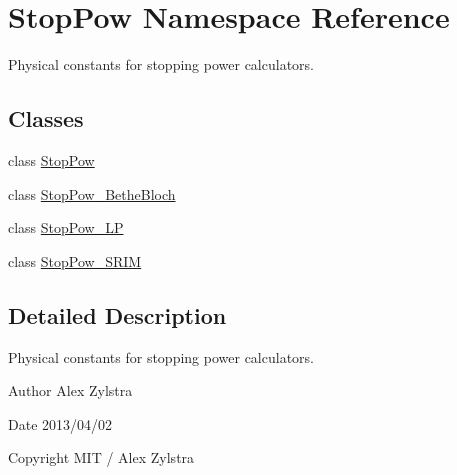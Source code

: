 \hypertarget{namespace_stop_pow}{\section{Stop\-Pow Namespace Reference}
\label{namespace_stop_pow}
}


Physical constants for stopping power calculators.  


\subsection*{Classes}
\begin{DoxyCompactItemize}
\item 
class \hyperlink{class_stop_pow_1_1_stop_pow}{Stop\-Pow}
\item 
class \hyperlink{class_stop_pow_1_1_stop_pow___bethe_bloch}{Stop\-Pow\-\_\-\-Bethe\-Bloch}
\item 
class \hyperlink{class_stop_pow_1_1_stop_pow___l_p}{Stop\-Pow\-\_\-\-L\-P}
\item 
class \hyperlink{class_stop_pow_1_1_stop_pow___s_r_i_m}{Stop\-Pow\-\_\-\-S\-R\-I\-M}
\end{DoxyCompactItemize}


\subsection{Detailed Description}
Physical constants for stopping power calculators. \begin{DoxyAuthor}{Author}
Alex Zylstra 
\end{DoxyAuthor}
\begin{DoxyDate}{Date}
2013/04/02 
\end{DoxyDate}
\begin{DoxyCopyright}{Copyright}
M\-I\-T / Alex Zylstra 
\end{DoxyCopyright}
